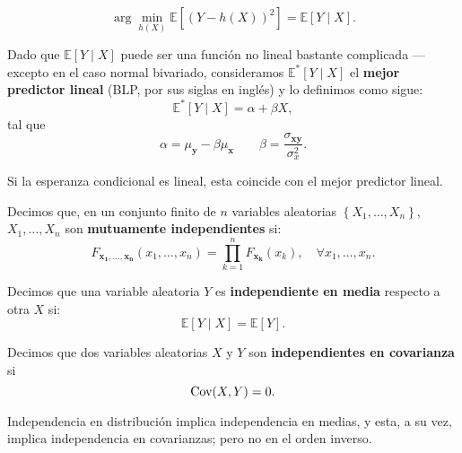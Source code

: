 \documentclass[8pt,a4paper]{extarticle}
\begin{document}
\begin{multicols}{3}
	\begin{boxprop}[]
		\[
			\arg\min_{h(X)} \mathbb{E}\left[ \left( Y - h(X) \right)^2  \right] = \mathbb{E}\left[ Y  \mid X \right]
			.\]
	\end{boxprop}

	\begin{boxdef}
		Dado que $\mathbb{E}[Y  \mid X]$ puede ser una función no lineal bastante complicada --- excepto en el caso normal bivariado, consideramos $\mathbb{E}^* [Y  \mid X]$ el \textbf{mejor predictor lineal} (BLP, por sus siglas en inglés) y lo definimos como sigue:
		\[
			\mathbb{E}^*\left[ Y  \mid X \right] = \alpha + \beta X
			,\]
		tal que
		\[
			\alpha = \mu_{\mathbf{y}} - \beta \mu_{\mathbf{x}} \qquad \beta = \frac{\sigma_{\mathbf{xy}}}{\sigma^2_{x}}
			.\]
	\end{boxdef}

	\begin{boxtheo}[]
		Si la esperanza condicional es lineal, esta coincide con el mejor predictor lineal.
	\end{boxtheo}

	\sectionbreak

	\begin{boxdef}
		Decimos que, en un conjunto finito de $n$ variables aleatorias $\left\{ X_1, \ldots, X_n \right\}$, $X_1, \ldots, X_n$ son \textbf{mutuamente independientes} si:
		\[
			F_{\mathbf{x_1,\ldots,x_n}} (x_1, \ldots, x_n) = \prod_{k=1}^{n} F_{\mathbf{x_k}} (x_k), \quad \forall x_1, \ldots, x_n
			.\]
	\end{boxdef}

	\begin{boxdef}
		Decimos que una variable aleatoria $Y$ es \textbf{independiente en media} respecto a otra $X$ si:
		\[
			\mathbb{E}[Y  \mid X] = \mathbb{E}[Y]
			.\]
	\end{boxdef}

	\begin{boxdef}
		Decimos que dos variables aleatorias $X$ y $Y$ son \textbf{independientes en covarianza} si
		\[
			\text{\normalfont Cov}(X,Y) = 0
			.\]
	\end{boxdef}

	\begin{boxtheo}[]
		Independencia en distribución implica independencia en medias, y esta, a su vez, implica independencia en covarianzas; pero no en el orden inverso.
	\end{boxtheo}


\end{multicols}
\end{document}
